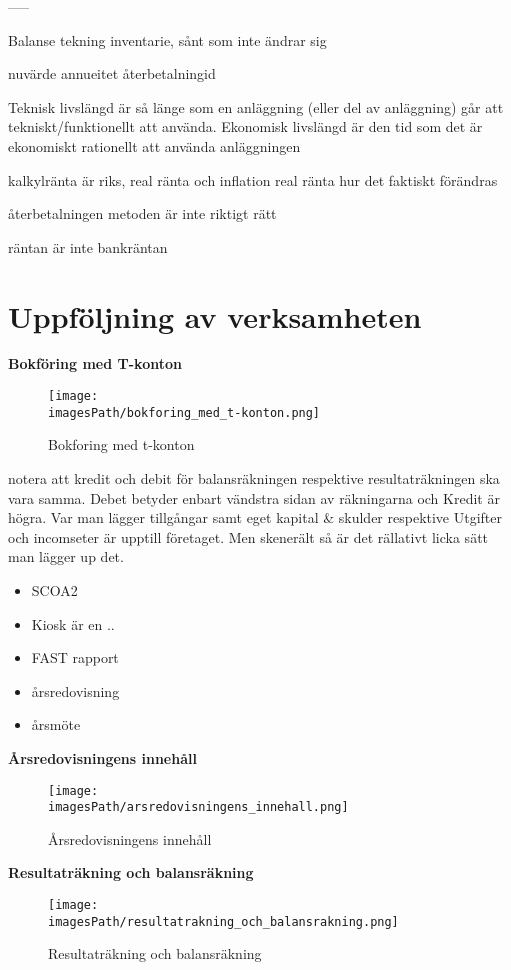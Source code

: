 \documentclass{article}
\newcommand{\imagesPath}{images}
\begin{document}
-----

Balanse tekning
inventarie, sånt som inte ändrar sig

nuvärde
annueitet
återbetalningid

Teknisk livslängd är så länge som en anläggning (eller del av anläggning) går att tekniskt/funktionellt att använda. Ekonomisk livslängd är den tid som det är ekonomiskt rationellt att använda anläggningen


kalkylränta är riks, real ränta och inflation
real ränta hur det faktiskt förändras

återbetalningen metoden är inte riktigt rätt

räntan är inte bankräntan

\section{Uppföljning av verksamheten}

\textbf{Bokföring med T-konton}
\begin{figure}[!h]
    \centering
    \texttt{[image: \\imagesPath/bokforing\_med\_t-konton.png]}
    \caption{Bokforing med t-konton}
\end{figure}
notera att kredit och debit för balansräkningen respektive resultaträkningen ska vara samma.
Debet betyder enbart vändstra sidan av räkningarna och Kredit är högra.
Var man lägger tillgångar samt eget kapital \& skulder respektive Utgifter och incomseter är 
upptill företaget. Men skenerält så är det rällativt licka sätt man lägger up det.

\begin{itemize}
    \item SCOA2
    \item Kiosk är en ..
    \item FAST rapport
    \item årsredovisning
    \item årsmöte
\end{itemize}

\textbf{Årsredovisningens innehåll}
\begin{figure}[!h]
    \centering
    \texttt{[image: \\imagesPath/arsredovisningens\_innehall.png]}
    \caption{Årsredovisningens innehåll}
\end{figure}

\textbf{Resultaträkning och balansräkning}
\begin{figure}[!h]
    \centering
    \texttt{[image: \\imagesPath/resultatrakning\_och\_balansrakning.png]}
    \caption{Resultaträkning och balansräkning}
\end{figure}
\end{document}
